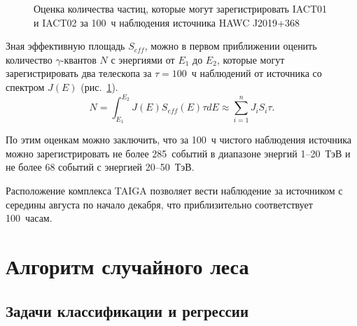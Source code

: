 \documentclass[magd,floatypics,numeref]{msudipl} %
\begin{document}
\begin{figure}[b]
	\noindent{}
	\caption{Оценка количества частиц, которые могут зарегистрировать IACT01 и IACT02 за 100~ч наблюдения источника HAWC J2019+368}
	\label{pic:EffectiveSpectra}
\end{figure}

Зная эффективную площадь $S_{eff}$, можно в первом приближении оценить количество $\gamma$-квантов $N$ с энергиями от $E_1$ до $E_2$, которые могут зарегистрировать два телескопа за $\tau = 100$~ч наблюдений от источника со спектром $J(E)$ (рис.~\ref{pic:EffectiveSpectra}\afterpage{\clearpage}).
\begin{equation}
N = \int^{E_2}_{E_1} J(E) S_{eff}(E)\tau dE \approx \sum^n_{i = 1} J_i S_i \tau.
\end{equation}

По этим оценкам можно заключить, что за 100~ч чистого наблюдения источника можно зарегистрировать не более 285~событий в диапазоне энергий 1--20~ТэВ и не более 68 событий с энергией 20--50~ТэВ.

Расположение комплекса TAIGA позволяет вести наблюдение за источником с середины августа по начало декабря, что приблизительно соответствует 100~часам. 
\chapter{Алгоритм случайного леса}
\section{Задачи классификации и регрессии}
\end{document}
